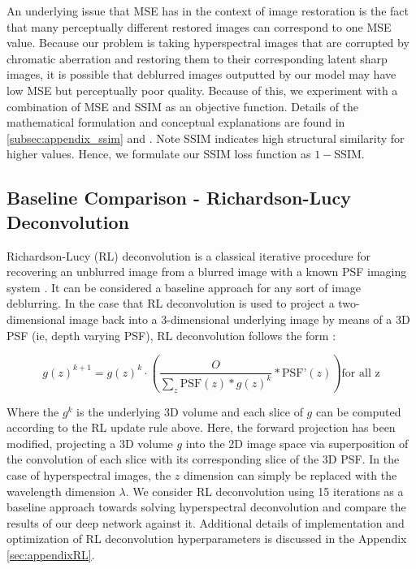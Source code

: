 \documentclass{article}
\begin{document}
An underlying issue that MSE has in the context of image restoration is the fact that many perceptually different restored images can correspond to one MSE value. Because our problem is taking hyperspectral images that are corrupted by chromatic aberration and restoring them to their corresponding latent sharp images, it is possible that deblurred images outputted by our model may have low MSE but perceptually poor quality. Because of this, we experiment with a combination of MSE and SSIM as an objective function. Details of the mathematical formulation and conceptual explanations are found in \ref{subsec:appendix_ssim} and \cite{Brunet_Vrscay_Wang_2011}. Note SSIM indicates high structural similarity for higher values. Hence, we formulate our SSIM loss function as $1 - $SSIM.

\subsection{Baseline Comparison - Richardson-Lucy Deconvolution}
Richardson-Lucy (RL) deconvolution is a classical iterative procedure for recovering an unblurred image from a blurred image with a known PSF imaging system \cite{lucy1974iterative}\cite{richardson1972bayesian}. It can be considered a baseline approach for any sort of image deblurring. In the case that RL deconvolution is used to project a two-dimensional image back into a 3-dimensional underlying image by means of a 3D PSF (ie, depth varying PSF), RL deconvolution follows the form \cite{broxton2013wave}\cite{guo2019fourier}:

\begin{equation}
    g(z)^{k+1} = g(z)^{k} \cdot \left(\frac{O}{\sum_{z} \text{PSF}(z) \ast g(z)^{k} } \ast \text{PSF'}(z)\right)\text{for all z}
    \label{eq:RL}
\end{equation}

Where the $g^k$ is the underlying 3D volume and each slice of $g$ can be computed according to the RL update rule above. Here, the forward projection has been modified, projecting a 3D volume $g$ into the 2D image space via superposition of the convolution of each slice with its corresponding slice of the 3D PSF. In the case of hyperspectral images, the $z$ dimension can simply be replaced with the wavelength dimension $\lambda$. We consider RL deconvolution using 15 iterations as a baseline approach towards solving hyperspectral deconvolution and compare the results of our deep network against it. Additional details of implementation and optimization of RL deconvolution hyperparameters is discussed in the Appendix \ref{sec:appendixRL}.
\end{document}
